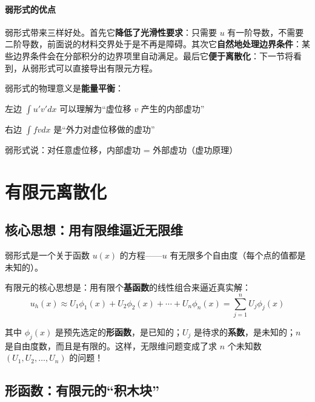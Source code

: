 
\paragraph{弱形式的优点}

弱形式带来三样好处。首先它\textbf{降低了光滑性要求}：只需要 $u$ 有一阶导数，不需要二阶导数，前面说的材料交界处于是不再是障碍。其次它\textbf{自然地处理边界条件}：某些边界条件会在分部积分的边界项里自动满足。最后它\textbf{便于离散化}：下一节将看到，从弱形式可以直接导出有限元方程。

\begin{physicalmeaning}
弱形式的物理意义是\textbf{能量平衡}：

左边 $\int u' v' dx$ 可以理解为“虚位移 $v$ 产生的内部虚功”

右边 $\int fv dx$ 是“外力对虚位移做的虚功”

弱形式说：对任意虚位移，内部虚功 = 外部虚功（虚功原理）
\end{physicalmeaning}

\section{有限元离散化}

\subsection{核心思想：用有限维逼近无限维}

弱形式是一个关于函数 $u(x)$ 的方程——$u$ 有无限多个自由度（每个点的值都是未知的）。

有限元的核心思想是：用有限个\textbf{基函数}的线性组合来逼近真实解：
\begin{equation}
u_h(x) \approx U_1 \phi_1(x) + U_2 \phi_2(x) + \cdots + U_n \phi_n(x) = \sum_{j=1}^n U_j \phi_j(x)
\end{equation}

其中 $\phi_j(x)$ 是预先选定的\textbf{形函数}，是已知的；$U_j$ 是待求的\textbf{系数}，是未知的；$n$ 是自由度数，而且是有限的。这样，无限维问题变成了求 $n$ 个未知数 $(U_1, U_2, \ldots, U_n)$ 的问题！

\subsection{形函数：有限元的“积木块”}

